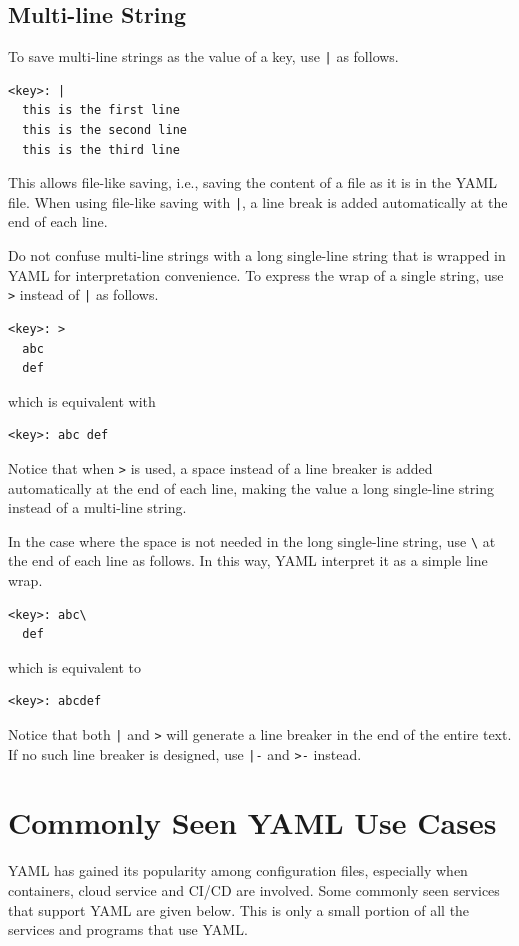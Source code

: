 \subsection{Multi-line String}

To save multi-line strings as the value of a key, use \texttt{|} as follows.
\begin{lstlisting}
<key>: |
  this is the first line
  this is the second line
  this is the third line
\end{lstlisting}
This allows file-like saving, i.e., saving the content of a file as it is in the YAML file. When using file-like saving with \texttt{|}, a line break is added automatically at the end of each line.

Do not confuse multi-line strings with a long single-line string that is wrapped in YAML for interpretation convenience. To express the wrap of a single string, use \verb|>| instead of \texttt{|} as follows.
\begin{lstlisting}
<key>: >
  abc
  def
\end{lstlisting}
which is equivalent with
\begin{lstlisting}
<key>: abc def
\end{lstlisting}
Notice that when \verb|>| is used, a space instead of a line breaker is added automatically at the end of each line, making the value a long single-line string instead of a multi-line string.

In the case where the space is not needed in the long single-line string, use \verb|\| at the end of each line as follows. In this way, YAML interpret it as a simple line wrap.
\begin{lstlisting}
<key>: abc\
  def
\end{lstlisting}
which is equivalent to
\begin{lstlisting}
<key>: abcdef
\end{lstlisting}

Notice that both \texttt{|} and \verb|>| will generate a line breaker in the end of the entire text. If no such line breaker is designed, use \texttt{|-} and \verb|>-| instead.

\section{Commonly Seen YAML Use Cases}

YAML has gained its popularity among configuration files, especially when containers, cloud service and CI/CD are involved. Some commonly seen services that support YAML are given below. This is only a small portion of all the services and programs that use YAML.

